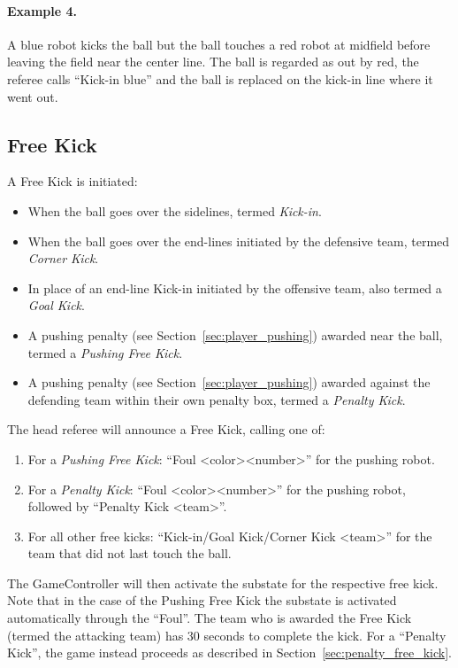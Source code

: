 \documentclass[12pt]{article}
\newcommand{\FreeKickTime}{30 seconds\xspace}
\begin{document}
\paragraph{Example 4.} A blue robot kicks the ball but the ball touches a red robot at midfield before leaving the field near the center line. The ball is regarded as out by red, the referee calls ``Kick-in blue'' and the ball is replaced on the kick-in line where it went out.

\subsection{Free Kick}
\label{sec:free_kick}

A Free Kick is initiated:
\begin{itemize}
  \item When the ball goes over the sidelines, termed \emph{Kick-in}.
  \item When the ball goes over the end-lines initiated by the defensive team, termed \emph{Corner Kick}.
  \item In place of an end-line Kick-in initiated by the offensive team, also termed a \emph{Goal Kick}.
  \item A pushing penalty (see Section~\ref{sec:player_pushing}) awarded near the ball, termed a \emph{Pushing Free Kick}.
  \item A pushing penalty (see Section~\ref{sec:player_pushing}) awarded against the defending team within their own penalty box, termed a \textit{Penalty Kick}.
\end{itemize}

The head referee will announce a Free Kick, calling one of:
\begin{enumerate}
  \item For a \textit{Pushing Free Kick}: ``Foul \textless color\textgreater \textless number\textgreater'' for the pushing robot.
  \item For a \textit{Penalty Kick}: ``Foul \textless color\textgreater \textless number\textgreater'' for the pushing robot, followed by ``Penalty Kick \textless team\textgreater''.
  \item For all other free kicks: ``Kick-in/Goal Kick/Corner Kick \textless team\textgreater'' for the team that did not last touch the ball.
\end{enumerate}

The GameController will then activate the substate for the respective free kick. Note that in the case of the Pushing Free Kick the substate is activated automatically through the ``Foul''.
The team who is awarded the Free Kick (termed the attacking team) has \FreeKickTime to complete the kick.
For a ``Penalty Kick'', the game instead proceeds as described in Section~\ref{sec:penalty_free_kick}.
\end{document}

